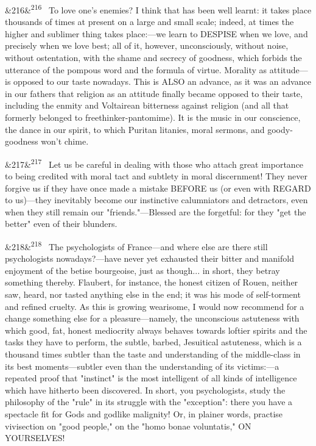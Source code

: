 \documentclass[12pt]{article}
\newcommand{\para}[1][]{\par\noindent\ifx&#1&\else\textsuperscript{\footnotesize #1}~\fi}
\begin{document}
\para[216] To love one's enemies? I think that has been well learnt: it takes place thousands of times at present on a large and small scale; indeed, at times the higher and sublimer thing takes place:---we learn to DESPISE when we love, and precisely when we love best; all of it, however, unconsciously, without noise, without ostentation, with the shame and secrecy of goodness, which forbids the utterance of the pompous word and the formula of virtue. Morality as attitude---is opposed to our taste nowadays. This is ALSO an advance, as it was an advance in our fathers that religion as an attitude finally became opposed to their taste, including the enmity and Voltairean bitterness against religion (and all that formerly belonged to freethinker-pantomime). It is the music in our conscience, the dance in our spirit, to which Puritan litanies, moral sermons, and goody-goodness won't chime.

\para[217] Let us be careful in dealing with those who attach great importance to being credited with moral tact and subtlety in moral discernment! They never forgive us if they have once made a mistake BEFORE us (or even with REGARD to us)---they inevitably become our instinctive calumniators and detractors, even when they still remain our "friends."---Blessed are the forgetful: for they "get the better" even of their blunders.

\para[218] The psychologists of France---and where else are there still psychologists nowadays?---have never yet exhausted their bitter and manifold enjoyment of the betise bourgeoise, just as though... in short, they betray something thereby. Flaubert, for instance, the honest citizen of Rouen, neither saw, heard, nor tasted anything else in the end; it was his mode of self-torment and refined cruelty. As this is growing wearisome, I would now recommend for a change something else for a pleasure---namely, the unconscious astuteness with which good, fat, honest mediocrity always behaves towards loftier spirits and the tasks they have to perform, the subtle, barbed, Jesuitical astuteness, which is a thousand times subtler than the taste and understanding of the middle-class in its best moments---subtler even than the understanding of its victims:---a repeated proof that "instinct" is the most intelligent of all kinds of intelligence which have hitherto been discovered. In short, you psychologists, study the philosophy of the "rule" in its struggle with the "exception": there you have a spectacle fit for Gods and godlike malignity! Or, in plainer words, practise vivisection on "good people," on the "homo bonae voluntatis," ON YOURSELVES!
\end{document}
